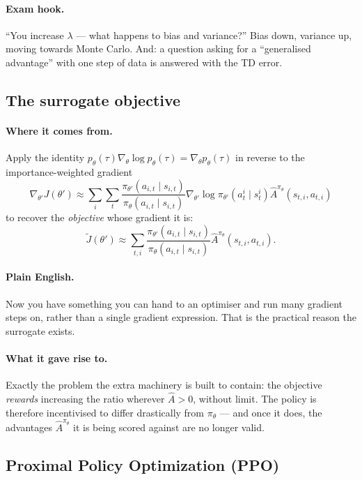 \documentclass[11pt,a4paper]{article}
\begin{document}
\paragraph{Exam hook.} ``You increase $\lambda$ --- what happens to bias and
variance?'' Bias down, variance up, moving towards Monte Carlo. And: a
question asking for a ``generalised advantage'' with one step of data is
answered with the TD error.

\subsection{The surrogate objective}

\paragraph{Where it comes from.} Apply the identity
$p_\theta(\tau)\nabla_\theta\log p_\theta(\tau)=\nabla_\theta p_\theta(\tau)$
in reverse to the importance-weighted gradient
\[
\nabla_{\theta'}J(\theta')\approx\sum_i\sum_t
\frac{\pi_{\theta'}(a_{i,t}\mid s_{i,t})}{\pi_\theta(a_{i,t}\mid s_{i,t})}
\nabla_{\theta'}\log\pi_{\theta'}(a^i_t\mid s^i_t)\hat A^{\pi_\theta}(s_{t,i},a_{t,i})
\]
to recover the \emph{objective} whose gradient it is:
\[
\tilde J(\theta')\approx \sum_{t,i}
\frac{\pi_{\theta'}(a_{i,t}\mid s_{i,t})}{\pi_\theta(a_{i,t}\mid s_{i,t})}
\hat A^{\pi_\theta}(s_{t,i},a_{t,i}).
\]

\paragraph{Plain English.} Now you have something you can hand to an
optimiser and run many gradient steps on, rather than a single gradient
expression. That is the practical reason the surrogate exists.

\paragraph{What it gave rise to.} Exactly the problem the extra machinery is
built to contain: the objective \emph{rewards} increasing the ratio wherever
$\hat A>0$, without limit. The policy is therefore incentivised to differ
drastically from $\pi_\theta$ --- and once it does, the advantages
$\hat A^{\pi_\theta}$ it is being scored against are no longer valid.

\subsection{Proximal Policy Optimization (PPO)}
\end{document}
